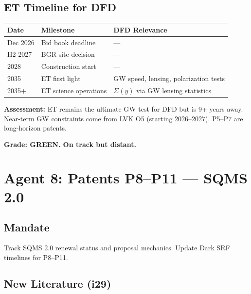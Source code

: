\documentclass[11pt,a4paper]{article}
\begin{document}
\subsection{ET Timeline for DFD}
\begin{center}
\begin{tabular}{lll}
\toprule
\textbf{Date} & \textbf{Milestone} & \textbf{DFD Relevance} \\
\midrule
Dec 2026 & Bid book deadline & --- \\
H2 2027 & BGR site decision & --- \\
2028 & Construction start & --- \\
2035 & ET first light & GW speed, lensing, polarization tests \\
2035+ & ET science operations & $\Sigma(y)$ via GW lensing statistics \\
\bottomrule
\end{tabular}
\end{center}

\textbf{Assessment:} ET remains the ultimate GW test for DFD but is 9+ years away. Near-term GW constraints come from LVK O5 (starting 2026--2027). P5--P7 are long-horizon patents.

\textbf{Grade: GREEN. On track but distant.}

\section{Agent 8: Patents P8--P11 --- SQMS 2.0}

\subsection{Mandate}
Track SQMS 2.0 renewal status and proposal mechanics. Update Dark SRF timelines for P8--P11.

\subsection{New Literature (i29)}
\end{document}
